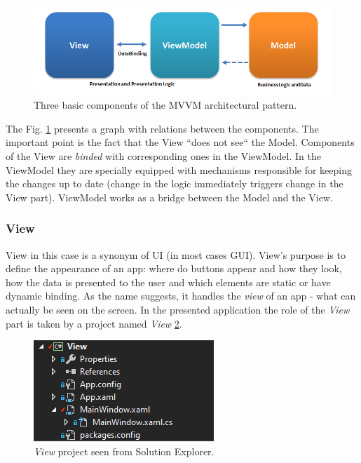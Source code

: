     \begin{figure}[H]
        \centering
        \includegraphics[width=\textwidth]{img/MVVMPattern.png}
        \caption{Three basic components of the MVVM architectural pattern.}
        \label{fig:mvvm_pattern}
    \end{figure}
    The Fig. \ref{fig:mvvm_pattern} presents a graph with relations between the  components. The important point is the fact that the View ``does not see`` the Model. Components of the View are \textit{binded} with corresponding ones in the ViewModel. In the ViewModel they are specially equipped with mechanisms responsible for keeping the changes up to date (change in the logic immediately triggers change in the View part). ViewModel works as a bridge between the Model and the View.
    
    \subsubsection{View} 
        View in this case is a synonym of UI (in most cases GUI). View's purpose is to define the appearance of an app: where do buttons appear and how they look, how the data is presented to the user and which elements are static or have dynamic binding. As the name suggests, it handles the \textit{view} of an app - what can actually be seen on the screen.
        In the presented application the role of the \textit{View} part is taken by a project named \textit{View} \ref{fig:view}.
        
        \begin{figure}[H]
            \centering
            \includegraphics{img/view.png}
            \caption{\textit{View} project seen from Solution Explorer.}
            \label{fig:view}
        \end{figure}
        
